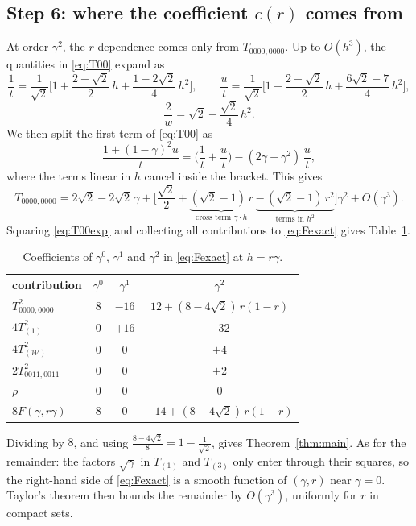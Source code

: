 \documentclass[11pt,a4paper]{article}
\theoremstyle{plain}
\newcommand{\cW}{\mathcal{W}}
\begin{document}
\subsection*{Step 6: where the coefficient \texorpdfstring{$c(r)$}{c(r)} comes from}

At order $\gamma^2$, the $r$-dependence comes only from $T_{0000,0000}$. Up to $O(h^3)$, the quantities in \eqref{eq:T00} expand as
\[
\frac1t=\frac1{\sqrt2}\Big[1+\frac{2-\sqrt2}2\,h+\frac{1-2\sqrt2}4\,h^2\Big],\qquad
\frac ut=\frac1{\sqrt2}\Big[1-\frac{2-\sqrt2}2\,h+\frac{6\sqrt2-7}4\,h^2\Big],
\]
\[
\frac2w=\sqrt2-\frac{\sqrt2}4\,h^2 .
\]
We then split the first term of \eqref{eq:T00} as
\[
\frac{1+(1-\gamma)^2u}t=\Big(\frac1t+\frac ut\Big)-(2\gamma-\gamma^2)\,\frac ut ,
\]
where the terms linear in $h$ cancel inside the bracket. This gives
\begin{equation}\label{eq:T00exp}
T_{0000,0000}=2\sqrt2-2\sqrt2\,\gamma+\Big[\frac{\sqrt2}2+\underbrace{(\sqrt2-1)\,r}_{\text{cross term }\gamma\cdot h}\ \underbrace{-\,(\sqrt2-1)\,r^2}_{\text{terms in }h^2}\Big]\gamma^2+O(\gamma^3).
\end{equation}
Squaring \eqref{eq:T00exp} and collecting all contributions to \eqref{eq:Fexact} gives Table~\ref{tab:collect}.

\begin{table}[ht]
\centering
\renewcommand{\arraystretch}{1.3}
\begin{tabular}{@{}lccc@{}}
\toprule
contribution & $\gamma^0$ & $\gamma^1$ & $\gamma^2$\\
\midrule
$T_{0000,0000}^2$ & $8$ & $-16$ & $12+(8-4\sqrt2)\,r(1-r)$\\
$4T_{(1)}^2$ & $0$ & $+16$ & $-32$\\
$4T_{(\cW)}^2$ & $0$ & $0$ & $+4$\\
$2T_{0011,0011}^2$ & $0$ & $0$ & $+2$\\
$\rho$ & $0$ & $0$ & $0$\\
\midrule
$8F(\gamma,r\gamma)$ & $8$ & $0$ & $-14+(8-4\sqrt2)\,r(1-r)$\\
\bottomrule
\end{tabular}
\caption{Coefficients of $\gamma^0$, $\gamma^1$ and $\gamma^2$ in \eqref{eq:Fexact} at $h=r\gamma$.}
\label{tab:collect}
\end{table}

Dividing by $8$, and using $\frac{8-4\sqrt2}8=1-\frac1{\sqrt2}$, gives Theorem~\ref{thm:main}. As for the remainder: the factors $\sqrt\gamma$ in $T_{(1)}$ and $T_{(3)}$ only enter through their squares, so the right-hand side of \eqref{eq:Fexact} is a smooth function of $(\gamma,r)$ near $\gamma=0$. Taylor's theorem then bounds the remainder by $O(\gamma^3)$, uniformly for $r$ in compact sets.
\end{document}
